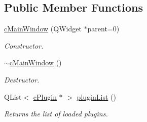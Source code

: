 \subsection*{Public Member Functions}
\begin{DoxyCompactItemize}
\item 
\hyperlink{classc_main_window_a04f0ed523c7265f8d8b304e33aaa7d6d}{c\+Main\+Window} (Q\+Widget $\ast$parent=0)
\begin{DoxyCompactList}\small\item\em Constructor. \end{DoxyCompactList}\item 
\hyperlink{classc_main_window_a5b40588af59f559083925f3f491da1e1}{$\sim$c\+Main\+Window} ()
\begin{DoxyCompactList}\small\item\em Destructor. \end{DoxyCompactList}\item 
Q\+List$<$ \hyperlink{classc_plugin}{c\+Plugin} $\ast$ $>$ \hyperlink{classc_main_window_ae82e278f9aa88d228cd049392a314251}{plugin\+List} ()
\begin{DoxyCompactList}\small\item\em Returns the list of loaded plugins. \end{DoxyCompactList}\end{DoxyCompactItemize}
